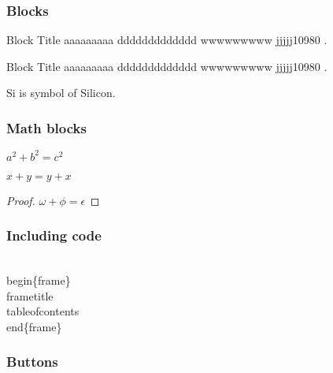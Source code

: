 \documentclass[10pt]{beamer}
\begin{document}
\begin{frame}
	\label{blocks}
	\frametitle{Blocks}
	\begin{block}{Block Title}
	aaaaaaaaa ddddddddddddd wwwwwwwww
	jjjjj10980 .
	\end{block}
	
	\begin{alertblock}{Block Title}
	aaaaaaaaa ddddddddddddd wwwwwwwww
	jjjjj10980 .
	\end{alertblock}
	
	\begin{definition}
		Si is symbol of Silicon.
	\end{definition}
\end{frame}

\begin{frame}
\label{mathblock}
	\frametitle{Math blocks}
	\begin{theorem}[Pythagoras]
		$a^2 + b^2 = c^2$
	\end{theorem}
	\begin{corollary}
		$x + y = y + x$
	\end{corollary}
	\begin{proof}
		$\omega + \phi = \epsilon$
	\end{proof}
\end{frame}

\begin{frame}[fragile]
\label{code}
	\frametitle{Including code}
	\begin{semiverbatim}
	\\begin\{frame\}
	\\frametitle
	\\tableofcontents
	\\end\{frame\}
	\end{semiverbatim}
\end{frame}

\begin{frame}[fragile]
\frametitle{Buttons}
\hyperlink{blocks}{}
\hyperlink{code}{}
\hyperlink{mathblock}{}
\end{frame}
\end{document}
